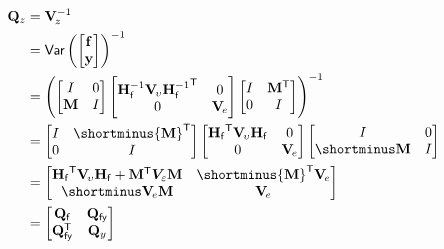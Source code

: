 \documentclass[notitlepage,a4paper,12pt]{article}
\newcommand{\transpose}[1]{{#1}^{\sf{T}}}
\begin{document}
\begin{align*}
    \mathbf{Q}_z 
    &= 
    \mathbf{V}^{-1}_{\!z} \\
    &= 
    \text{\sf{Var}}\left(
    \begin{bmatrix}
        \mathbf{f} \\
        \mathbf{y}
    \end{bmatrix}
    \right)^{-1} \\
    &=  
    \left(
    \begin{bmatrix}
        I & 0 \\
        \mathbf{M} & I
    \end{bmatrix}
    \begin{bmatrix}
        \mathbf{H}_{\sf{f}}^{-1} \mathbf{V}_{\!\upsilon} \transpose{\mathbf{H}_{\sf{f}}^{-1}} & 0 \\
        0 & \mathbf{V}_{\!e}
    \end{bmatrix} 
    \begin{bmatrix}
        I & \transpose{\mathbf{M}} \\
        0 & I
    \end{bmatrix}
    \right)^{-1}\\
    &=
    \begin{bmatrix}
        I & \shortminus\transpose{\mathbf{M}} \\
        0 & I
    \end{bmatrix}
    \begin{bmatrix}
        \transpose{\mathbf{H}_{\sf{f}}} \mathbf{V}_{\!\upsilon} \mathbf{H}_{\sf{f}} & 0 \\
        0 & \mathbf{V}_{\!e}
    \end{bmatrix} 
    \begin{bmatrix}
        I & 0 \\
        \shortminus\mathbf{M} & I 
    \end{bmatrix} \\
    &=
    \begin{bmatrix}
         \transpose{\mathbf{H}_{\sf{f}}} \mathbf{V}_{\!\upsilon} \mathbf{H}_{\sf{f}} + \transpose{\mathbf{M}}\bm{V}_{\varepsilon}\mathbf{M}  & \shortminus \transpose{\mathbf{M}} \mathbf{V}_{\!e} \\
         \shortminus \mathbf{V}_{\!e} \mathbf{M} & \mathbf{V}_{\!e}
    \end{bmatrix} \\
    &= 
    \begin{bmatrix}
        \mathbf{Q}_{\sf{f}} & \mathbf{Q}_{\sf{f} y} \\
        \transpose{\mathbf{Q}}_{\sf{f} y} & \mathbf{Q}_{y}  
    \end{bmatrix}
\end{align*}
\end{document}
